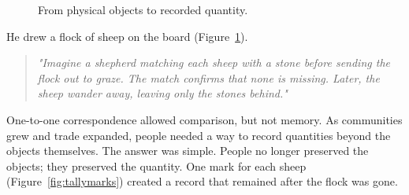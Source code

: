 \documentclass[11pt]{article}
\begin{document}
\begin{figure}[ht]
\centering


\caption{ From physical objects to recorded quantity.}

\label{fig:memoryproblem}

\end{figure}


He drew a flock of sheep on the board (Figure~\ref{fig:memoryproblem}).

\begin{quote}
\emph{"Imagine a shepherd matching each sheep with a stone before sending the flock out to graze. The match confirms that none is missing. Later, the sheep wander away, leaving only the stones behind."}
\end{quote}


One-to-one correspondence allowed comparison, but not memory. As communities grew and trade expanded, people needed a way to record quantities beyond the objects themselves. The answer was simple. People no longer preserved the objects; they preserved the quantity. One mark for each sheep (Figure~\ref{fig:tallymarks}) created a record that remained after the flock was gone.

\end{document}
